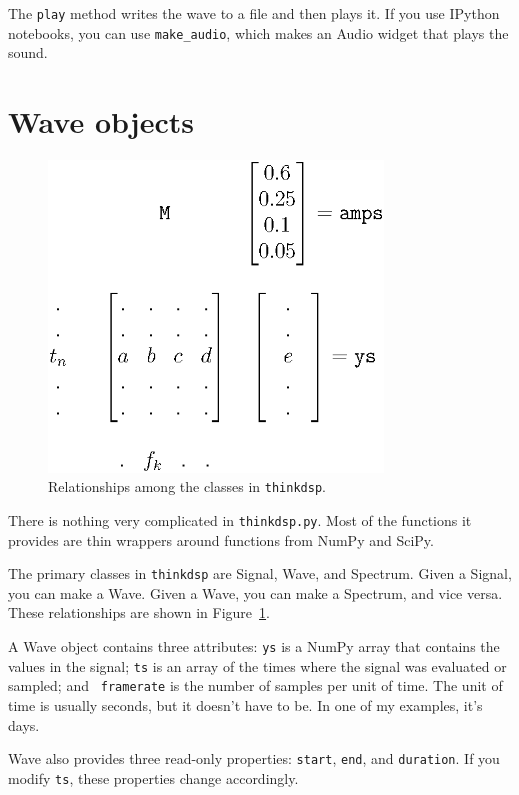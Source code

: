 \documentclass[12pt]{book}
\begin{document}
The {\tt play} method writes the wave to a file and then plays it.
If you use IPython notebooks, you can use \verb"make_audio", which
makes an Audio widget that plays the sound.


\section{Wave objects}

\begin{figure}
\centerline{\includegraphics[width=3.5in]{figs/diagram1.eps}}
\caption{Relationships among the classes in {\tt thinkdsp}.}
\label{fig.diagram1}
\end{figure}

There is nothing very complicated in {\tt thinkdsp.py}.  Most
of the functions it provides are thin wrappers around functions
from NumPy and SciPy.

The primary classes in {\tt thinkdsp} are Signal, Wave, and Spectrum.
Given a Signal, you can make a Wave.  Given a Wave, you can
make a Spectrum, and vice versa.  These relationships are shown
in Figure~\ref{fig.diagram1}.

A Wave object contains three attributes: {\tt ys} is a NumPy array
that contains the values in the signal; {\tt ts} is an array of the
times where the signal was evaluated or sampled; and {\tt
  framerate} is the number of samples per unit of time.  The
unit of time is usually seconds, but it doesn't have to be.  In
one of my examples, it's days.

Wave also provides three read-only properties: {\tt start},
{\tt end}, and {\tt duration}.  If you modify {\tt ts}, these
properties change accordingly.
\end{document}
